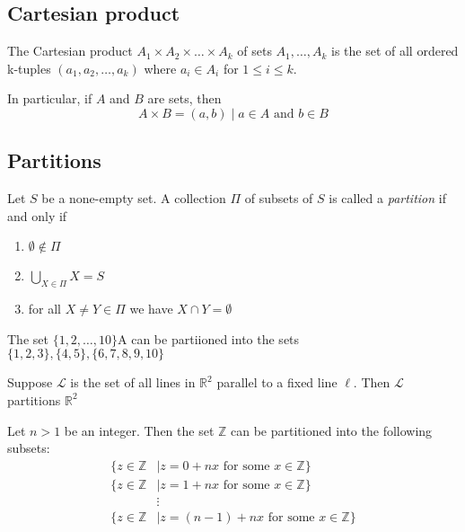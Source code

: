 \subsection{Cartesian product}
\begin{definition}
    The Cartesian product $ A_1 \times A_2 \times \dots \times A_k $ of sets $ A_1,\dots,A_k $ is the set of all ordered k-tuples $ (a_1,a_2,\dots,a_k) $ where $ a_i \in A_i $ for $ 1 \leq i \leq k $. \par
    In particular, if $A$ and $B$ are sets, then
    $$ A \times B = {(a,b) \mid a \in A \text{ and } b \in B} $$
\end{definition}

\subsection{Partitions}
\begin{definition}[Partition]
    Let $S$ be a none-empty set. A collection $ \Pi $ of subsets of $S$ is called a \emph{partition} if and only if
    \begin{enumerate}
        \item $ \emptyset \notin \Pi $
        \item $ \bigcup_{X \in \Pi}X = S $
        \item for all $ X \ne Y \in \Pi $ we have $ X \cap Y = \emptyset $
    \end{enumerate}
\end{definition}

\begin{example}
    The set $ \{1,2,\dots,10\} $A can be partiioned into the sets $ \{1,2,3\}, \{4,5\}, \{6,7,8,9,10\} $
\end{example}
\begin{example}
    Suppose $ \mathcal{L} $ is the set of all lines in $\mathbb{R}^2$ parallel to a fixed line $\ell$. Then $ \mathcal{L} $ partitions $\mathbb{R}^2$
\end{example}
\begin{example}
    Let $ n > 1 $ be an integer. Then the set $ \mathbb{Z} $ can be partitioned into the following subsets:
    \begin{align*}
        \{z \in \mathbb{Z} &\mid z = 0 + nx \text{ for some } x \in \mathbb{Z}\} \\
        \{z \in \mathbb{Z} &\mid z = 1 + nx \text{ for some } x \in \mathbb{Z}\} \\
                           &\vdots \\
        \{z \in \mathbb{Z} &\mid z = (n-1) + nx \text{ for some } x \in \mathbb{Z}\} \\
    \end{align*}
\end{example}

